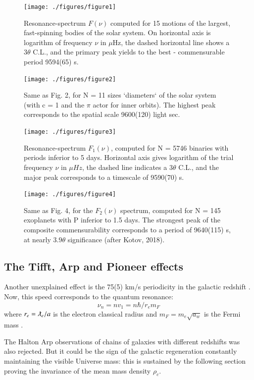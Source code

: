 \documentclass[twoside,draft]{article}
\begin{document}
\begin{sloppypar}
\begin{figure}
\centering
\texttt{[image: ./figures/figure1]}
\caption{Resonance-spectrum $F(\nu)$ computed for 15 motions of the largest, fast-spinning bodies of the solar system. On horizontal axis is logarithm of frequency $\nu$ in $\mu$Hz, the dashed horizontal line shows a $ 3 \theta $ C.L., and the primary peak yields to the best - commensurable period 9594(65) s.}
\label{fig:figure_label}
\end{figure}

\begin{figure}
\centering
\texttt{[image: ./figures/figure2]}
\caption{Same as Fig. 2, for N = 11 sizes `diameters` of the solar system (with c = 1 and the $\pi$ actor for inner orbits). The highest peak corresponds to the spatial scale 9600(120) light sec.}
\label{fig:figure_label}
\end{figure}

\begin{figure}
\centering
\texttt{[image: ./figures/figure3]}
\caption{Resonance-spectrum $F_{1} ( \nu)$, computed for N = 5746 binaries with periods inferior to 5 days. Horizontal axis gives logarithm of the trial frequency $\nu$ in $\mu Hz$, the dashed line indicates a $3 \theta$ C.L., and the major peak corresponds to a timescale of 9590(70) s.}
\label{fig:figure_label}
\end{figure}

\begin{figure}
\centering
\texttt{[image: ./figures/figure4]}
\caption{Same as Fig. 4, for the $F_{2} ( \nu )$ spectrum, computed for N = 145 exoplanets with P inferior to 1.5 days. The strongest peak of the composite commensurability corresponds to a period of 9640(115) s, at nearly $3.9\theta$ significance (after Kotov, 2018).}
\label{fig:figure_label}
\end{figure}

\subsection{The Tifft, Arp and Pioneer effects}

Another unexplained effect is the 75(5) km/s periodicity in the galactic redshift \cite{Tifft}. Now, this speed corresponds to the quantum resonance: $$\nu_{n} = nv_{1} =n\hbar /r_{e} m_{F} $$ where $r_{e} = \lambdabar_e/a$ is the electron classical radius and $m_{F} = m_{e}\sqrt{a_{w}}$ is the Fermi mass \cite{Sanchez5}.

The Halton Arp observations of chains of galaxies with different redshifts \cite{Arp} was also rejected. But it could be the sign of the galactic regeneration constantly maintaining the visible Universe mass: this is sustained by the following section proving the invariance of the mean mass density $\rho_{c}$.


\end{sloppypar}
\end{document}
